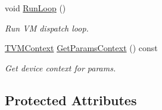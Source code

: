 \begin{DoxyCompactItemize}
void \hyperlink{classtvm_1_1runtime_1_1vm_1_1VirtualMachine_ad83dfc94ba5e62875df9e780c750487b}{Run\+Loop} ()
\begin{DoxyCompactList}\small\item\em Run VM dispatch loop. \end{DoxyCompactList}\item 
\hyperlink{c__runtime__api_8h_a9363bb701f16ce5bbb381f2a013d25b4}{T\+V\+M\+Context} \hyperlink{classtvm_1_1runtime_1_1vm_1_1VirtualMachine_aa85f2bba2f829a2976a68035151ff590}{Get\+Params\+Context} () const 
\begin{DoxyCompactList}\small\item\em Get device context for params. \end{DoxyCompactList}\end{DoxyCompactItemize}
\subsection*{Protected Attributes}
